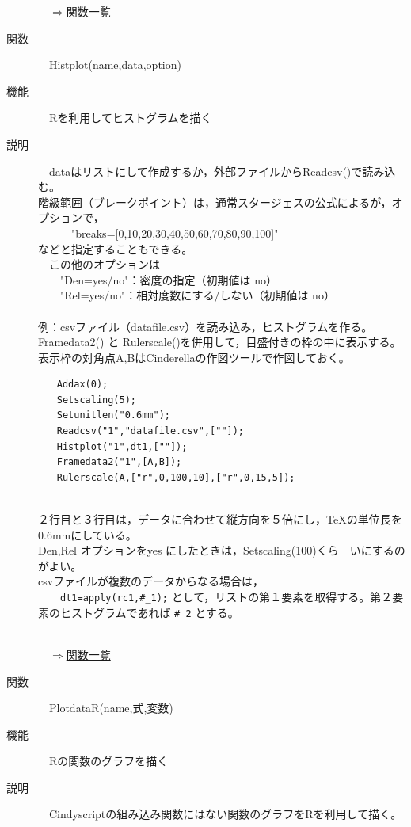 \documentclass[papersize,a4paper,12pt,uplatex]{jsarticle}
\begin{document}
\begin{description}
\begin{flushright}　\hyperlink{functionlist}{$\Rightarrow$関数一覧}\end{flushright}
\hypertarget{histplot}{}
\item[関数]　Histplot(name,data,option)
\item[機能]　Rを利用してヒストグラムを描く
\item[説明]　dataはリストにして作成するか，外部ファイルからReadcsv()で読み込む。\\
階級範囲（ブレークポイント）は，通常スタージェスの公式によるが，オプションで，\\
　　　"breaks=[0,10,20,30,40,50,60,70,80,90,100]"\\
などと指定することもできる。\\
　この他のオプションは\\
　　"Den=yes/no"：密度の指定（初期値は no）\\
　　"Rel=yes/no"：相対度数にする/しない（初期値は no）\\
　\\
例：csvファイル（datafile.csv）を読み込み，ヒストグラムを作る。Framedata2() と Rulerscale()を併用して，目盛付きの枠の中に表示する。表示枠の対角点A,BはCinderellaの作図ツールで作図しておく。
\begin{verbatim}
　　Addax(0);
　　Setscaling(5);
　　Setunitlen("0.6mm");
　　Readcsv("1","datafile.csv",[""]);
　　Histplot("1",dt1,[""]);
　　Framedata2("1",[A,B]);
　　Rulerscale(A,["r",0,100,10],["r",0,15,5]);
\end{verbatim}
　　\\

２行目と３行目は，データに合わせて縦方向を５倍にし，TeXの単位長を0.6mmにしている。\\
Den,Rel オプションをyes にしたときは，Setscaling(100)くら　いにするのがよい。\\
csvファイルが複数のデータからなる場合は，\\
　　\verb|dt1=apply(rc1,#_1);|
として，リストの第１要素を取得する。第２要素のヒストグラムであれば  \verb|#_2| とする。\\
　\\
\begin{flushright}　\hyperlink{functionlist}{$\Rightarrow$関数一覧}\end{flushright}

\hypertarget{plotdatar}{}
\item[関数]　PlotdataR(name,式,変数)
\item[機能]　Rの関数のグラフを描く
\item[説明]　Cindyscriptの組み込み関数にはない関数のグラフをRを利用して描く。\\


\end{description}
\end{document}
